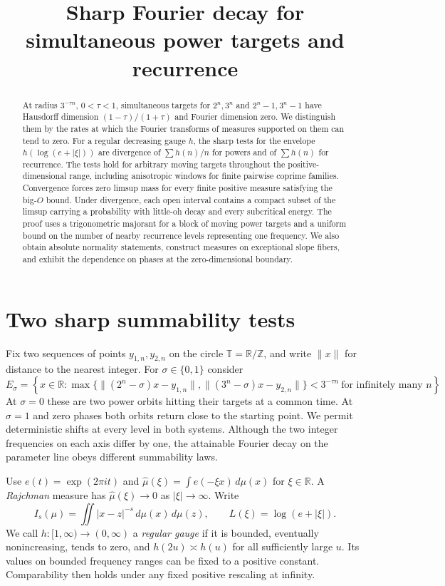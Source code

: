 \documentclass[11pt,a4paper,reqno]{amsart}
\title[Fourier decay for power targets and recurrence]{Sharp Fourier decay for simultaneous power targets and recurrence}
\date{}
\theoremstyle{definition}
\theoremstyle{remark}
\numberwithin{equation}{section}
\begin{document}
\begin{abstract}
At radius \(3^{-\tau n}\), \(0<\tau<1\), simultaneous targets for
\(2^n,3^n\) and \(2^n-1,3^n-1\) have Hausdorff dimension
\((1-\tau)/(1+\tau)\) and Fourier dimension zero. We distinguish
them by the rates at which the Fourier
transforms of measures supported on them can tend to zero. For a
regular decreasing gauge \(h\), the sharp tests for the envelope
\(h(\log(e+|\xi|))\) are divergence of \(\sum h(n)/n\) for powers and
of \(\sum h(n)\) for recurrence. The tests hold for arbitrary moving
targets throughout the positive-dimensional range, including
anisotropic windows for finite pairwise coprime families. Convergence
forces zero limsup mass for every finite positive measure satisfying
the big-\(O\) bound.
Under divergence, each open interval contains a compact subset
of the limsup carrying a probability with little-oh decay and
every subcritical energy.
The proof uses a trigonometric majorant for a block of moving power
targets and a uniform bound on the number of nearby recurrence levels
representing one frequency. We also obtain absolute normality
statements, construct measures on exceptional slope fibers, and
exhibit the dependence on phases at the zero-dimensional boundary.
\end{abstract}
\maketitle
\tableofcontents

\section{Two sharp summability tests}\label{sec:intro}
Fix two sequences of points \(y_{1,n},y_{2,n}\) on the circle
\(\mathbb T=\mathbb R/\mathbb Z\), and write \(\|x\|\) for distance to
the nearest integer. For \(\sigma\in\{0,1\}\) consider
\[
 E_\sigma=\left\{x\in\mathbb R:
  \max\big\{\|(2^n-\sigma)x-y_{1,n}\|,\|(3^n-\sigma)x-y_{2,n}\|\big\}
  <3^{-\tau n}\ \text{for infinitely many } n\right\}.
\]
At \(\sigma=0\) these are two power orbits hitting their targets at a
common time. At \(\sigma=1\) and zero phases both orbits return close
to the starting point. We permit deterministic shifts at every level
in both systems. Although the two integer frequencies on each axis
differ by one, the attainable Fourier decay on the parameter line
obeys different summability laws.

Use \(e(t)=\exp(2\pi i t)\) and
\(\widehat\mu(\xi)=\int e(-\xi x)\,d\mu(x)\) for \(\xi\in\mathbb R\).
A \emph{Rajchman} measure has \(\widehat\mu(\xi)\to0\) as
\(|\xi|\to\infty\). Write
\[
 I_s(\mu)=\iint |x-z|^{-s}\,d\mu(x)\,d\mu(z),\qquad
 L(\xi)=\log(e+|\xi|).
\]
We call \(h:[1,\infty)\to(0,\infty)\) a \emph{regular gauge} if it is
bounded, eventually nonincreasing, tends to zero, and
\(h(2u)\asymp h(u)\) for all sufficiently large \(u\). Its values on
bounded frequency ranges can be fixed to a positive constant.
Comparability then holds under any fixed positive rescaling at infinity.
\end{document}
